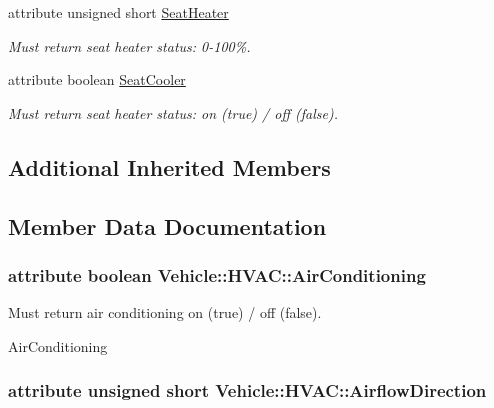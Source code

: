 \begin{DoxyCompactItemize}
attribute unsigned short \hyperlink{interfaceVehicle_1_1HVAC_ad8fa919cd65bcb69651ee4853f1f0a1f}{Seat\-Heater}
\begin{DoxyCompactList}\small\item\em Must return seat heater status\-: 0-\/100\%. \end{DoxyCompactList}\item 
attribute boolean \hyperlink{interfaceVehicle_1_1HVAC_a8ff708ae94435d515ba61e22a35fd4ec}{Seat\-Cooler}
\begin{DoxyCompactList}\small\item\em Must return seat heater status\-: on (true) / off (false). \end{DoxyCompactList}\end{DoxyCompactItemize}
\subsection*{Additional Inherited Members}


\subsection{Member Data Documentation}
\hypertarget{interfaceVehicle_1_1HVAC_aa5e6696f4580bda42f447695ec282a76}{
\subsubsection[{Air\-Conditioning}]{\setlength{\rightskip}{0pt plus 5cm}attribute boolean Vehicle\-::\-H\-V\-A\-C\-::\-Air\-Conditioning}}\label{interfaceVehicle_1_1HVAC_aa5e6696f4580bda42f447695ec282a76}


Must return air conditioning on (true) / off (false). 

Air\-Conditioning \hypertarget{interfaceVehicle_1_1HVAC_a531a6a5dd011770471794dccd168b420}{
\subsubsection[{Airflow\-Direction}]{\setlength{\rightskip}{0pt plus 5cm}attribute unsigned short Vehicle\-::\-H\-V\-A\-C\-::\-Airflow\-Direction}}\label{interfaceVehicle_1_1HVAC_a531a6a5dd011770471794dccd168b420}


